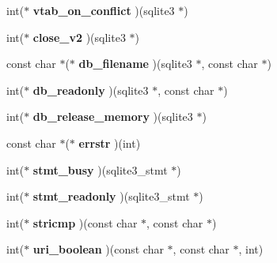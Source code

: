 \begin{DoxyCompactItemize}
int($\ast$ {\bfseries vtab\+\_\+on\+\_\+conflict} )(sqlite3 $\ast$)
\item 
\mbox{\label{structsqlite3__api__routines_abb98b8486cbe7d739b8840d3d90baa30}} 
int($\ast$ {\bfseries close\+\_\+v2} )(sqlite3 $\ast$)
\item 
\mbox{\label{structsqlite3__api__routines_a100ccb514682b7eb4280ababd67e9831}} 
const char $\ast$($\ast$ {\bfseries db\+\_\+filename} )(sqlite3 $\ast$, const char $\ast$)
\item 
\mbox{\label{structsqlite3__api__routines_a192b2ee2b6bd5a57cbb74bf72266a9e7}} 
int($\ast$ {\bfseries db\+\_\+readonly} )(sqlite3 $\ast$, const char $\ast$)
\item 
\mbox{\label{structsqlite3__api__routines_a32bf57d7ff76e4153ca7fe2552bd168f}} 
int($\ast$ {\bfseries db\+\_\+release\+\_\+memory} )(sqlite3 $\ast$)
\item 
\mbox{\label{structsqlite3__api__routines_a853ce95bc126e615a9ba9b30de8fbb62}} 
const char $\ast$($\ast$ {\bfseries errstr} )(int)
\item 
\mbox{\label{structsqlite3__api__routines_a046c107f8b417c85acc32a4d964aa913}} 
int($\ast$ {\bfseries stmt\+\_\+busy} )(sqlite3\+\_\+stmt $\ast$)
\item 
\mbox{\label{structsqlite3__api__routines_a04499bf64d666eb00fb19ae01cdbb8b1}} 
int($\ast$ {\bfseries stmt\+\_\+readonly} )(sqlite3\+\_\+stmt $\ast$)
\item 
\mbox{\label{structsqlite3__api__routines_aa6c2af28787384ae1f266ba2d7d97972}} 
int($\ast$ {\bfseries stricmp} )(const char $\ast$, const char $\ast$)
\item 
\mbox{\label{structsqlite3__api__routines_ac0aebc3fb86e2537e04be6db52d4a395}} 
int($\ast$ {\bfseries uri\+\_\+boolean} )(const char $\ast$, const char $\ast$, int)
\item 
\mbox{\label{structsqlite3__api__routines_a70dfce68b81e6c77b3e6c3d8e874c070}} 

\end{DoxyCompactItemize}
